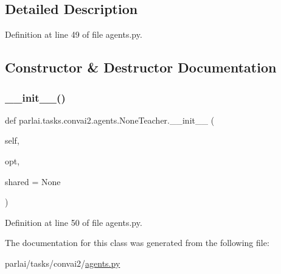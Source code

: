 \subsection{Detailed Description}


Definition at line 49 of file agents.\+py.



\subsection{Constructor \& Destructor Documentation}
\mbox{\label{classparlai_1_1tasks_1_1convai2_1_1agents_1_1NoneTeacher_ab4fbfba45b52e37ca3293273880b56e6}} 
\subsubsection{\texorpdfstring{\+\_\+\+\_\+init\+\_\+\+\_\+()}{\_\_init\_\_()}}
{\footnotesize\ttfamily def parlai.\+tasks.\+convai2.\+agents.\+None\+Teacher.\+\_\+\+\_\+init\+\_\+\+\_\+ (\begin{DoxyParamCaption}\item[{}]{self,  }\item[{}]{opt,  }\item[{}]{shared = {\ttfamily None} }\end{DoxyParamCaption})}



Definition at line 50 of file agents.\+py.



The documentation for this class was generated from the following file\+:\begin{DoxyCompactItemize}
\item 
parlai/tasks/convai2/\hyperlink{parlai_2tasks_2convai2_2agents_8py}{agents.\+py}\end{DoxyCompactItemize}
